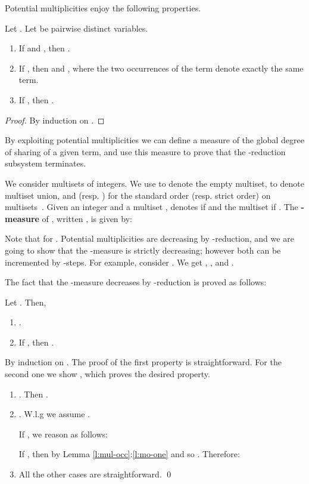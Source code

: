 \documentclass{LMCS}
\renewcommand{\>}{\rightarrow}
\begin{document}
Potential multiplicities enjoy the following properties.

\begin{lem}
\label{l:properties-mul-for-terms}
Let . Let  be pairwise distinct variables.
\begin{enumerate}[\rm(1)]
\item \label{l:pmt-1} If  and ,
then .
\item \label{l:pmt-2}  If ,
then  and  
, where the two
occurrences of the term  denote exactly the same term. 
\item \label{l:pmt-3} 
If  , then .
\end{enumerate}
\end{lem}

\begin{proof}
By induction on .
\end{proof}

By exploiting potential multiplicities we can define a measure of the
global degree of sharing of a given term, and use this
  measure to prove that the -reduction subsystem terminates.

We consider multisets of integers. We use  to denote the empty
multiset,  to denote multiset union, and 
  (resp. ) for the standard order (resp. strict order) on
  multisets~\cite{Nipkow-Baader}.  Given an integer
 and a multiset ,  denotes  if 
and the multiset 
 if . The
\textbf{-measure} of , written , is given
by:
 

Note that  for . Potential
multiplicities are 
decreasing by -reduction, and we are going to show that the
-measure is strictly decreasing; however  both can be incremented by
-steps. For example, consider .  We get ,
  ,  and .

The fact that the -measure decreases by -reduction is proved as follows:

\begin{lem}
\label{l:properties-dm-for-terms}
Let . Then, 
\begin{enumerate}[\rm(1)]
\item \label{l:pdmt-1} .
\item \label{l:pdmt-2} If , then
.
\end{enumerate}
\end{lem}

\proof By induction on . The proof of the  first property is 
straightforward.
For the second one we show , which proves
the desired property.
\begin{enumerate}[]
\item . Then 
. 
\item . W.l.g we assume . 

If , we reason as follows:


If , then   by Lemma \ref{l:mul-occ}:\ref{l:mo-one} and so 
. Therefore:


\item All the other cases are straightforward.
\qed 
\end{enumerate}
\end{document}
